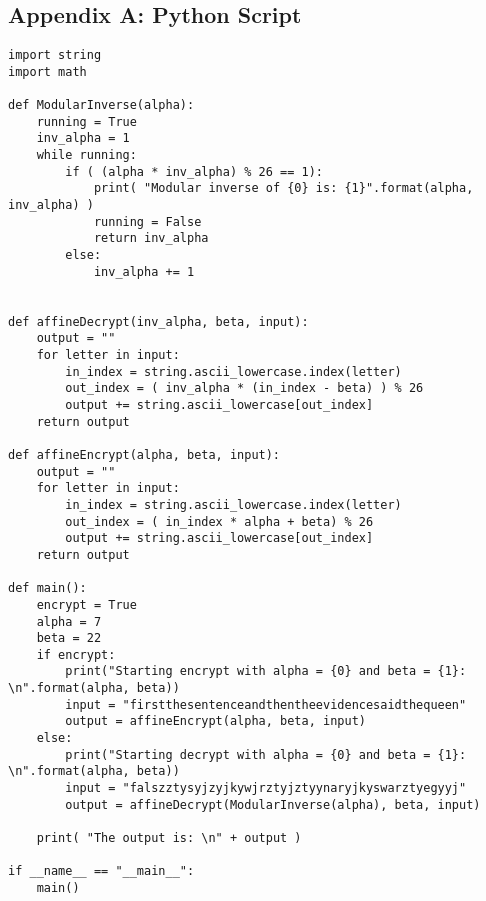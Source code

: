 \documentclass{article}
\begin{document}
\newpage
\subsection*{Appendix A:  Python Script}
\begin{minipage}[t]{1.05\textwidth}
\begin{lstlisting}
import string
import math

def ModularInverse(alpha):
	running = True
	inv_alpha = 1
	while running:
		if ( (alpha * inv_alpha) % 26 == 1):
			print( "Modular inverse of {0} is: {1}".format(alpha, inv_alpha) )
			running = False
			return inv_alpha
		else:
			inv_alpha += 1
			

def affineDecrypt(inv_alpha, beta, input):
	output = ""
	for letter in input:
		in_index = string.ascii_lowercase.index(letter)
		out_index = ( inv_alpha * (in_index - beta) ) % 26 
		output += string.ascii_lowercase[out_index]
	return output

def affineEncrypt(alpha, beta, input):
	output = ""
	for letter in input:
		in_index = string.ascii_lowercase.index(letter)
		out_index = ( in_index * alpha + beta) % 26 
		output += string.ascii_lowercase[out_index]
	return output

def main():
	encrypt = True
	alpha = 7
	beta = 22
	if encrypt:
		print("Starting encrypt with alpha = {0} and beta = {1}: \n".format(alpha, beta))
		input = "firstthesentenceandthentheevidencesaidthequeen"
		output = affineEncrypt(alpha, beta, input)
	else:
		print("Starting decrypt with alpha = {0} and beta = {1}: \n".format(alpha, beta))
		input = "falszztysyjzyjkywjrztyjztyynaryjkyswarztyegyyj"
		output = affineDecrypt(ModularInverse(alpha), beta, input)
	
	print( "The output is: \n" + output )

if __name__ == "__main__":
	main()
\end{lstlisting}
\end{minipage}
\end{document}
